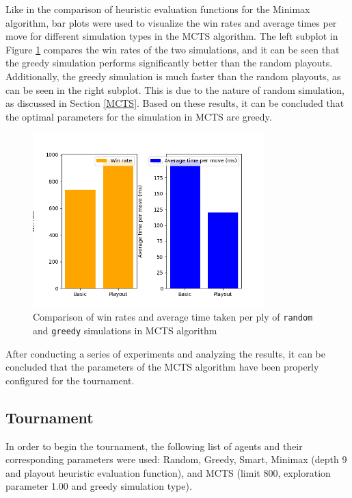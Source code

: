 Like in the comparison of heuristic evaluation functions for the Minimax algorithm, bar plots were used to visualize the win rates and average times per move for different simulation types in the MCTS algorithm. The left subplot in Figure \ref{mctsOWSimulations} compares the win rates of the two simulations, and it can be seen that the greedy simulation performs significantly better than the random playouts. Additionally, the greedy simulation is much faster than the random playouts, as can be seen in the right subplot. This is due to the nature of random simulation, as discussed in Section \ref{MCTS}. Based on these results, it can be concluded that the optimal parameters for the simulation in MCTS are greedy.

\begin{figure}[h]
  \centering
  \captionsetup{justification=centering}
  \includegraphics[width=0.8\textwidth]{../img/mcts_simulation_openworld.png}
  \caption{Comparison of win rates and average time taken per ply of \texttt{random} and \texttt{greedy} simulations in MCTS algorithm}
  \label{mctsOWSimulations}
\end{figure}

After conducting a series of experiments and analyzing the results, it can be concluded that the parameters of the MCTS algorithm have been properly configured for the tournament.

\subsection{Tournament}
In order to begin the tournament, the following list of agents and their corresponding parameters were used: Random, Greedy, Smart, Minimax (depth 9 and playout heuristic evaluation function), and MCTS (limit 800, exploration parameter 1.00 and greedy simulation type).

